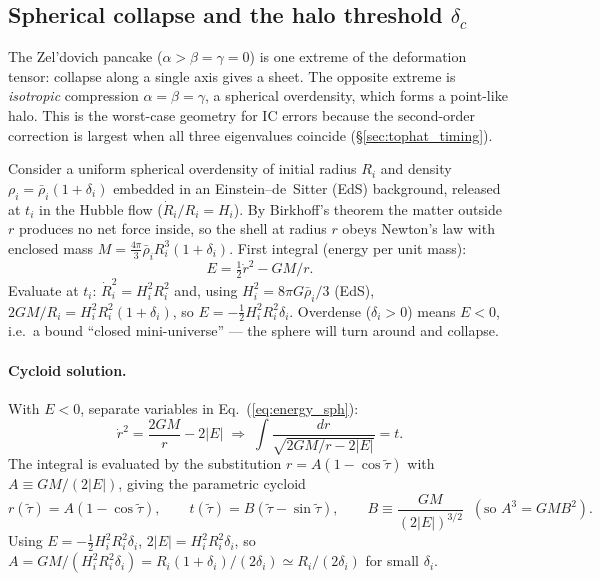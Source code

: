 \documentclass[12pt]{article}
\begin{document}
\subsection{Spherical collapse and the halo threshold $\delta_c$}
\label{sec:spherical}

The Zel'dovich pancake ($\alpha>\beta=\gamma=0$) is one extreme
of the deformation tensor: collapse along a single axis gives a
sheet.  The opposite extreme is \emph{isotropic} compression
$\alpha=\beta=\gamma$, a spherical overdensity, which forms a
point-like halo.  This is the worst-case geometry for IC errors
because the second-order correction is largest when all three
eigenvalues coincide (\S\ref{sec:tophat_timing}).

Consider a uniform spherical overdensity of initial radius $R_i$ and
density $\rho_i=\bar\rho_i(1+\delta_i)$ embedded in an
Einstein--de~Sitter (EdS) background, released at $t_i$ in the Hubble
flow ($\dot R_i/R_i = H_i$).  By Birkhoff's theorem the matter outside
$r$ produces no net force inside, so the shell at radius $r$ obeys
Newton's law with enclosed mass $M = \tfrac{4\pi}{3}\bar\rho_i
R_i^3(1+\delta_i)$.  First integral (energy per unit mass):
%
\begin{equation}
  E = \tfrac{1}{2}\dot r^2 - GM/r.
  \label{eq:energy_sph}
\end{equation}
%
Evaluate at $t_i$: $\dot R_i^2 = H_i^2 R_i^2$ and, using
$H_i^2 = 8\pi G\bar\rho_i/3$ (EdS),
$2GM/R_i = H_i^2 R_i^2(1+\delta_i)$, so
$E = -\tfrac{1}{2}H_i^2 R_i^2\delta_i$.  Overdense ($\delta_i>0$)
means $E<0$, i.e.\ a bound ``closed mini-universe'' --- the sphere
will turn around and collapse.

\paragraph{Cycloid solution.}  With $E<0$, separate variables in
Eq.~(\ref{eq:energy_sph}):
%
\begin{equation}
  \dot r^2 = \frac{2GM}{r} - 2|E|
  \;\Longrightarrow\;
  \int\!\frac{dr}{\sqrt{2GM/r - 2|E|}} = t.
\end{equation}
%
The integral is evaluated by the substitution
$r = A(1-\cos\tilde\tau)$ with $A \equiv GM/(2|E|)$, giving the
parametric cycloid
%
\begin{equation}
  r(\tilde\tau)=A(1-\cos\tilde\tau),\qquad
  t(\tilde\tau)=B(\tilde\tau-\sin\tilde\tau),
  \qquad B \equiv \frac{GM}{(2|E|)^{3/2}}
  \;\;(\text{so } A^3=GMB^2).
  \label{eq:sphcollapse}
\end{equation}
%
Using $E = -\tfrac{1}{2}H_i^2 R_i^2 \delta_i$,
$2|E| = H_i^2 R_i^2 \delta_i$, so
$A = GM/(H_i^2 R_i^2 \delta_i) = R_i(1+\delta_i)/(2\delta_i)
\simeq R_i/(2\delta_i)$ for small $\delta_i$.
\end{document}
